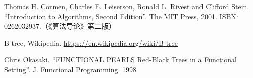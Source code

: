 \documentclass[b5paper]{ctexart}
\begin{document}
\ifx\wholebook\relax \else
\begin{thebibliography}{99}

Thomas H. Cormen, Charles E. Leiserson, Ronald L. Rivest and Clifford Stein. ``Introduction to Algorithms, Second Edition''. The MIT Press, 2001. ISBN: 0262032937.（《算法导论》第二版）

B-tree, Wikipedia. \url{https://en.wikipedia.org/wiki/B-tree}

Chris Okasaki. ``FUNCTIONAL PEARLS Red-Black Trees in a Functional Setting''. J. Functional Programming. 1998

\end{thebibliography}
\end{document}
